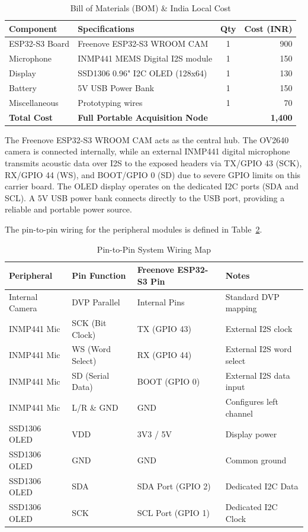 \documentclass[11pt,a4paper]{article}
\begin{document}
\begin{table}[!ht]
\centering
\caption{Bill of Materials (BOM) \& India Local Cost}
\label{tab:bom}
\begin{tabularx}{0.9\textwidth}{l X c r}
\toprule
\textbf{Component} & \textbf{Specifications} & \textbf{Qty} & \textbf{Cost (INR)} \\
\midrule
ESP32-S3 Board & Freenove ESP32-S3 WROOM CAM & 1 & 900 \\
Microphone & INMP441 MEMS Digital I2S module & 1 & 150 \\
Display & SSD1306 0.96" I2C OLED (128x64) & 1 & 130 \\
Battery & 5V USB Power Bank & 1 & 150 \\
Miscellaneous & Prototyping wires & 1 & 70 \\
\midrule
\textbf{Total Cost} & \textbf{Full Portable Acquisition Node} & & \textbf{1,400} \\
\bottomrule
\end{tabularx}
\end{table}

The Freenove ESP32-S3 WROOM CAM acts as the central hub. The OV2640 camera is connected internally, while an external INMP441 digital microphone transmits acoustic data over I2S to the exposed headers via TX/GPIO 43 (SCK), RX/GPIO 44 (WS), and BOOT/GPIO 0 (SD) due to severe GPIO limits on this carrier board. The OLED display operates on the dedicated I2C ports (SDA and SCL). A 5V USB power bank connects directly to the USB port, providing a reliable and portable power source.

The pin-to-pin wiring for the peripheral modules is defined in Table~\ref{tab:wiring}.

\begin{table}[!ht]
\centering
\caption{Pin-to-Pin System Wiring Map}
\label{tab:wiring}
\begin{tabular}{llll}
\toprule
\textbf{Peripheral} & \textbf{Pin Function} & \textbf{Freenove ESP32-S3 Pin} & \textbf{Notes} \\
\midrule
Internal Camera & DVP Parallel & Internal Pins & Standard DVP mapping \\
INMP441 Mic & SCK (Bit Clock) & TX (GPIO 43) & External I2S clock \\
INMP441 Mic & WS (Word Select) & RX (GPIO 44) & External I2S word select \\
INMP441 Mic & SD (Serial Data) & BOOT (GPIO 0) & External I2S data input \\
INMP441 Mic & L/R \& GND & GND & Configures left channel \\
\midrule
SSD1306 OLED & VDD & 3V3 / 5V & Display power \\
SSD1306 OLED & GND & GND & Common ground \\
SSD1306 OLED & SDA & SDA Port (GPIO 2) & Dedicated I2C Data \\
SSD1306 OLED & SCK & SCL Port (GPIO 1) & Dedicated I2C Clock \\
\bottomrule
\end{tabular}
\end{table}
\end{document}

